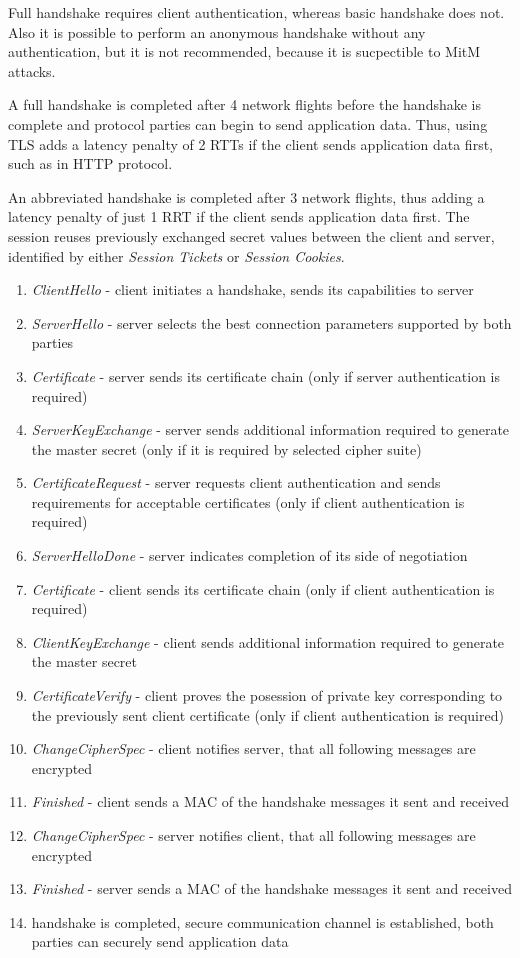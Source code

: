 Full handshake requires client authentication, whereas basic handshake does not. Also it is possible to perform an anonymous handshake without any authentication, but it is not recommended, because it is sucpectible to MitM attacks.

A full handshake is completed after 4 network flights before the handshake is complete and protocol parties can begin to send application data. Thus, using TLS adds a latency penalty of 2 RTTs if the client sends application data first, such as in HTTP protocol.

An abbreviated handshake is completed after 3 network flights, thus adding a latency penalty of just 1 RRT if the client sends application data first. The session reuses previously exchanged secret values between the client and server, identified by either \textit{Session Tickets} or \textit{Session Cookies}.

\begin{enumerate}
  \item \textit{ClientHello} - client initiates a handshake, sends its capabilities to server
  \item \textit{ServerHello} - server selects the best connection parameters supported by both parties
  \item \textit{Certificate} - server sends its certificate chain (only if server authentication is required)
  \item \textit{ServerKeyExchange} - server sends additional information required to generate the master secret (only if it is required by selected cipher suite)
  \item \textit{CertificateRequest} - server requests client authentication and sends requirements for acceptable certificates (only if client authentication is required)
  \item \textit{ServerHelloDone} - server indicates completion of its side of negotiation
  \item \textit{Certificate} - client sends its certificate chain (only if client authentication is required)
  \item \textit{ClientKeyExchange} - client sends additional information required to generate the master secret
  \item \textit{CertificateVerify} - client proves the posession of private key corresponding to the previously sent client certificate (only if client authentication is required)
  \item \textit{ChangeCipherSpec} - client notifies server, that all following messages are encrypted
  \item \textit{Finished} - client sends a MAC of the handshake messages it sent and received
  \item \textit{ChangeCipherSpec} - server notifies client, that all following messages are encrypted
  \item \textit{Finished} - server sends a MAC of the handshake messages it sent and received
  \item handshake is completed, secure communication channel is established, both parties can securely send application data
\end{enumerate}
